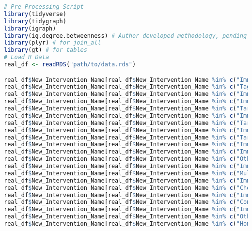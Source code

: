 \documentclass{article}
\begin{document}
\begin{lstlisting}[language=R]  % or Python, or whatever language
# Pre-Processing Script
library(tidyverse)
library(tidygraph)
library(igraph)
library(ig.degree.betweenness) # Author developed methodology, pending public release
library(plyr) # for join_all
library(gt) # for tables
# Load R Data
real_df <- readRDS("path/to/data.rds")

real_df$New_Intervention_Name[real_df$New_Intervention_Name %in% c("Immunotherapy- MAbs-immunomodulatory-Checkpoint")] <- "I: MAbs Checkpoint";
real_df$New_Intervention_Name[real_df$New_Intervention_Name %in% c("Tageted therapy- antibody-drug conjugate")] <- "T: Antibody-Drug Conjugate";
real_df$New_Intervention_Name[real_df$New_Intervention_Name %in% c("Immunotherapy- MAbs-immunomodulatory-Co-Stimulatory")] <- "I: MAbs Co-Stimulatory";
real_df$New_Intervention_Name[real_df$New_Intervention_Name %in% c("Immunotherapy- Immuno + other investigational agent")] <- "I: Combined";
real_df$New_Intervention_Name[real_df$New_Intervention_Name %in% c("Targeted therapy - combined (small molecule + monoclonal antibody)")] <- "T: Combined";
real_df$New_Intervention_Name[real_df$New_Intervention_Name %in% c("Immunotherapy- MAbs- Tumour-targeting (includes immunoconjugates, naked MAbs)")] <- "I: MAbs Targeting";
real_df$New_Intervention_Name[real_df$New_Intervention_Name %in% c("Targeted therapy - small molecule")] <- "T: Small Molecule";
real_df$New_Intervention_Name[real_df$New_Intervention_Name %in% c("Immunotherapy- Other")] <- "I: Other";
real_df$New_Intervention_Name[real_df$New_Intervention_Name %in% c("Targeted therapy - monoclonal antibody")] <- "T: Monoclonal Antibody";
real_df$New_Intervention_Name[real_df$New_Intervention_Name %in% c("Immunotherapy- Adoptive Cell Transfer (e.g. TILS)")] <- "I: Adoptive Cell Transfer";
real_df$New_Intervention_Name[real_df$New_Intervention_Name %in% c("Immunotherapy- combined types")] <- "I: Combined";
real_df$New_Intervention_Name[real_df$New_Intervention_Name %in% c("Other - drug repurposing")] <- "Drug Repurposing";
real_df$New_Intervention_Name[real_df$New_Intervention_Name %in% c("Immunotherapy- Cytokines (eg. INFa, IL, Hematopoietic growth factors)")] <- "I: MAbs Co-Stimulatory";
real_df$New_Intervention_Name[real_df$New_Intervention_Name %in% c("Multiple- Biomarker Targeted")] <- "T: Combined";
real_df$New_Intervention_Name[real_df$New_Intervention_Name %in% c("Immunotherapy- Anti Cancer Vaccine- Peptide based vaccine")] <- "I: Anti Cancer Vaccine";
real_df$New_Intervention_Name[real_df$New_Intervention_Name %in% c("Chemotherapy")] <- "Chemotherapy";
real_df$New_Intervention_Name[real_df$New_Intervention_Name %in% c("Immunotherapy- Oncolytic Virus")] <- "I: Oncolytic Virus";
real_df$New_Intervention_Name[real_df$New_Intervention_Name %in% c("Combined modality (e.g chemoradiation, EBRT+Brachy)")] <- "Combined Modality";
real_df$New_Intervention_Name[real_df$New_Intervention_Name %in% c("Immunotherapy- Anti Cancer Vaccine- Gene Therapy (e.g DNA/RNA vaccines)")] <- "I: Anti Cancer Vaccine";
real_df$New_Intervention_Name[real_df$New_Intervention_Name %in% c("Other - radioconjugate")] <- "Radioconjugate";
real_df$New_Intervention_Name[real_df$New_Intervention_Name %in% c("Homonal Treatment")] <- "Drug Repurposing";



\end{lstlisting}
\end{document}

